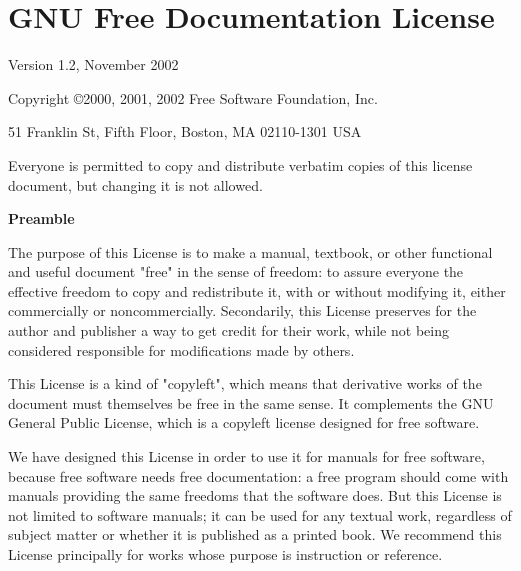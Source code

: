 \documentclass{stacks-project-book}
\theoremstyle{plain}
\theoremstyle{definition}
\theoremstyle{remark}
\numberwithin{equation}{subsection}
\begin{document}
%

\chapter{GNU Free Documentation License}

\label{fdl-section-phantom}

\begin{center}

      Version 1.2, November 2002


Copyright \copyright 2000, 2001, 2002  Free Software Foundation, Inc.

\bigskip

    51 Franklin St, Fifth Floor, Boston, MA  02110-1301  USA

\bigskip

Everyone is permitted to copy and distribute verbatim copies
of this license document, but changing it is not allowed.
\end{center}


\begin{center}
{\bf\large Preamble}
\end{center}

The purpose of this License is to make a manual, textbook, or other
functional and useful document "free" in the sense of freedom: to
assure everyone the effective freedom to copy and redistribute it,
with or without modifying it, either commercially or noncommercially.
Secondarily, this License preserves for the author and publisher a way
to get credit for their work, while not being considered responsible
for modifications made by others.

This License is a kind of "copyleft", which means that derivative
works of the document must themselves be free in the same sense.  It
complements the GNU General Public License, which is a copyleft
license designed for free software.

We have designed this License in order to use it for manuals for free
software, because free software needs free documentation: a free
program should come with manuals providing the same freedoms that the
software does.  But this License is not limited to software manuals;
it can be used for any textual work, regardless of subject matter or
whether it is published as a printed book.  We recommend this License
principally for works whose purpose is instruction or reference.
\end{document}
